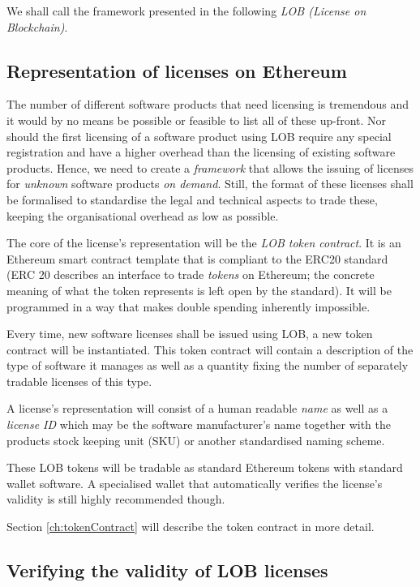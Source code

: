 \documentclass[a4paper]{article}
\begin{document}
We shall call the framework presented in the following \emph{LOB (License on Blockchain)}.


\subsection{Representation of licenses on Ethereum}

The number of different software products that need licensing is tremendous and it would by no means be possible or feasible to list all of these up-front. Nor should the first licensing of a software product using LOB require any special registration and have a higher overhead than the licensing of existing software products. Hence, we need to create a \emph{framework} that allows the issuing of licenses for \emph{unknown} software products \emph{on demand}. Still, the format of these licenses shall be formalised to standardise the legal and technical aspects to trade these, keeping the organisational overhead as low as possible.

The core of the license's representation will be the \emph{LOB token contract}. It is an Ethereum smart contract template that is compliant to the ERC20 \cite{erc20} standard (ERC 20 describes an interface to trade \emph{tokens} on Ethereum; the concrete meaning of what the token represents is left open by the standard). It will be programmed in a way that makes double spending inherently impossible.

Every time, new software licenses shall be issued using LOB, a new token contract will be instantiated. This token contract will contain a description of the type of software it manages as well as a quantity fixing the number of separately tradable licenses of this type.

A license's representation will consist of a human readable \emph{name} as well as a \emph{license ID} which may be the software manufacturer's name together with the products stock keeping unit (SKU) or another standardised naming scheme.

These LOB tokens will be tradable as standard Ethereum tokens with standard wallet software. A specialised wallet that automatically verifies the license's validity is still highly recommended though.

Section \ref{ch:tokenContract} will describe the token contract in more detail.

\subsection{Verifying the validity of LOB licenses}
\end{document}
